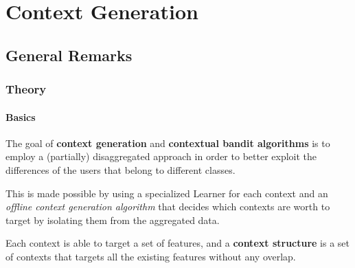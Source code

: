 \documentclass[11pt]{beamer}
\begin{document}




\AtBeginSection[]
{
\begin{frame}{}
    \tableofcontents[sections={\thesection}]
\end{frame}
}


\section{Context Generation}


\subsection{General Remarks}


\begin{frame}

\frametitle{Theory}
\framesubtitle{Basics}

The goal of \textbf{context generation} and \textbf{contextual bandit algorithms} is to employ a (partially) disaggregated approach in order to better exploit the differences of the users that belong to different classes.

This is made possible by using a specialized Learner for each context and an \textit{offline context generation algorithm} that decides which contexts are worth to target by isolating them from the aggregated data.

Each context is able to target a set of features, and a \textbf{context structure} is a set of contexts that targets all the existing features without any overlap.

\end{frame}
\end{document}
